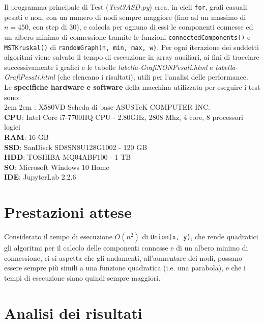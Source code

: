 \documentclass[]{article}
\def\code#1{\texttt{#1}} %
\begin{document}
Il programma principale di Test ({\em Test3ASD.py}) crea, in cicli \code{for}, grafi casuali pesati e non, con un numero di nodi sempre maggiore (fino ad un massimo di $n = 450$, con step di 30), e calcola per ognuno di essi le componenti connesse ed un albero minimo di connessione tramite le funzioni \code{connectedComponents()} e \code{MSTKruskal()} di \code{randomGraph(n, min, max, w)}. Per ogni iterazione dei suddetti algoritmi viene salvato il tempo di esecuzione in array ausiliari, ai fini di tracciare successivamente i grafici e le tabelle {\em tabella-GrafiNONPesati.html} e {\em tabella-GrafiPesati.html} (che elencano i risultati), utili per l'analisi delle performance.\\

Le {\bf specifiche hardware e software} della macchina utilizzata per eseguire i test sono:\\

\begingroup
\leftskip2em \rightskip2em
: X580VD Scheda di base ASUSTeK COMPUTER INC.\\
{\bf CPU}:  Intel Core i7-7700HQ CPU - 2.80GHz, 2808 Mhz, 4 core, 8 processori logici\\
{\bf RAM}: 16 GB\\
{\bf SSD}: SanDisck SD8SN8U128G1002 - 120 GB\\
{\bf HDD}: TOSHIBA MQ04ABF100 - 1 TB\\
{\bf SO}: Microsoft Windows 10 Home \\
{\bf IDE}: JupyterLab 2.2.6 \\
\vspace{-5mm}


\section*{Prestazioni attese}
Considerato il tempo di esecuzione $O(n^2)$ di \code{Union(x, y)}, che rende quadratici gli algoritmi per il calcolo delle componenti connesse e di un albero minimo di connessione, ci si aspetta che gli andamenti, all'aumentare dei nodi, possano essere sempre più simili a una funzione quadratica (i.e. una parabola), e che i tempi di esecuzione siano quindi sempre maggiori.

\section {Analisi dei risultati}
\vspace{-5mm}
\end{document}
